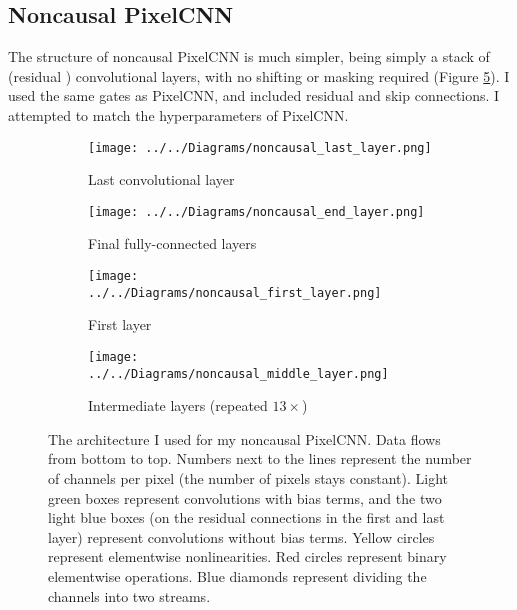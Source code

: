 \documentclass[10pt,a4paper]{article}
\begin{document}
\subsection{Noncausal PixelCNN}

The structure of noncausal PixelCNN is much simpler, being simply a stack of (residual \citep{resnet}) convolutional layers, with no shifting or masking required (Figure \ref{noncausal}). I used the same gates as PixelCNN, and included residual and skip connections. I attempted to match the hyperparameters of PixelCNN.

\begin{figure}
  \centering
  \vspace{-3cm}
    \begin{subfigure}{0.35\columnwidth}
    	\addtocounter{subfigure}{2}
        \centering
        \caption{Last convolutional layer}
        \texttt{[image: ../../Diagrams/noncausal\_last\_layer.png]} 
        \label{noncausal:last}
    \end{subfigure}
    \hfill
    \begin{subfigure}{0.45\columnwidth}
        \centering
        \caption{Final fully-connected layers}
        \texttt{[image: ../../Diagrams/noncausal\_end\_layer.png]} 
        \label{noncausal:end}
    \end{subfigure}
    \vspace{1cm}
    \addtocounter{subfigure}{-4}
    \begin{subfigure}{0.35\columnwidth}
        \centering
        \caption{First layer}
        \texttt{[image: ../../Diagrams/noncausal\_first\_layer.png]} 
        \label{noncausal:first}
    \end{subfigure}
    \hfill
    \begin{subfigure}{0.35\columnwidth}
        \centering
        \caption{Intermediate layers (repeated $13\times$)}
        \texttt{[image: ../../Diagrams/noncausal\_middle\_layer.png]} 
        \label{noncausal:middle}
    \end{subfigure}
  \caption{The architecture I used for my noncausal PixelCNN. Data flows from bottom to top. Numbers next to the lines represent the number of channels per pixel (the number of pixels stays constant). Light green boxes represent convolutions with bias terms, and the two light blue boxes (on the residual connections in the first and last layer) represent convolutions without bias terms. Yellow circles represent elementwise nonlinearities. Red circles represent binary elementwise operations. Blue diamonds represent dividing the channels into two streams.}
  \label{noncausal}
\end{figure}
\end{document}
